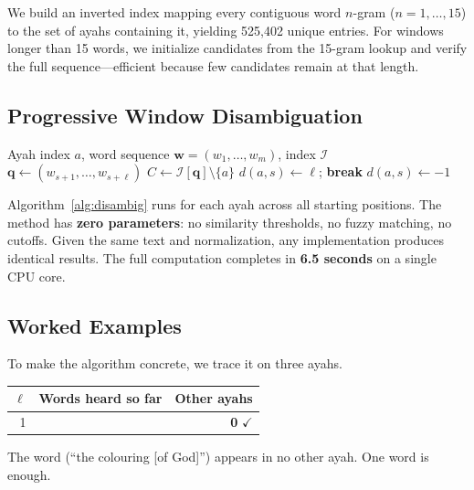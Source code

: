 \documentclass[11pt,a4paper]{article}
\newcommand{\textarabic}[1]{\texorpdfstring{\RL{#1}}{[Arabic]}}
\begin{document}
We build an inverted index mapping every contiguous word $n$-gram ($n = 1, \ldots, 15$) to the set of ayahs containing it, yielding 525{,}402 unique entries.
For windows longer than 15 words, we initialize candidates from the 15-gram lookup and verify the full sequence---efficient because few candidates remain at that length.

\subsection{Progressive Window Disambiguation}

\begin{algorithm}[t]
\caption{Disambiguation for one ayah}\label{alg:disambig}
\begin{algorithmic}[1]
\Require Ayah index $a$, word sequence $\mathbf{w} = (w_1, \ldots, w_m)$, index $\mathcal{I}$
    \State $\mathbf{q} \gets (w_{s+1}, \ldots, w_{s+\ell})$
    \State $C \gets \mathcal{I}[\mathbf{q}] \setminus \{a\}$ 
      \State $d(a, s) \gets \ell$; \textbf{break} 
    \EndIf
  \EndFor
    \State $d(a, s) \gets {-}1$ 
  \EndIf
\EndFor
\end{algorithmic}
\end{algorithm}

Algorithm~\ref{alg:disambig} runs for each ayah across all starting positions.
The method has \textbf{zero parameters}: no similarity thresholds, no fuzzy matching, no cutoffs.
Given the same text and normalization, any implementation produces identical results.
The full computation completes in \textbf{6.5 seconds} on a single CPU core.

\subsection{Worked Examples}
\label{sec:examples}

To make the algorithm concrete, we trace it on three ayahs.

\begin{algorithm}[H]
\caption{Trace: Q\,2:138 --- One word, instantly identified}
\label{alg:trace1}
\smallskip
\centering
\begin{tabular}{@{}r l r@{}}
\toprule
$\ell$ & \textbf{Words heard so far} & \textbf{Other ayahs} \\
\midrule
1 & \textarabic{صِبْغَةَ} & \textbf{0} $\checkmark$ \\
\bottomrule
\end{tabular}
\smallskip

\raggedright
The word \textarabic{صِبْغَةَ} (``the colouring [of God]'') appears in no other ayah. One word is enough.
\end{algorithm}
\end{document}

